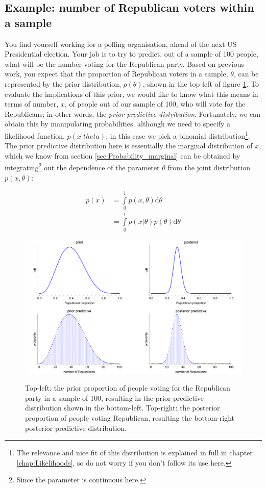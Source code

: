 \documentclass[11pt,fullpage]{book}
\begin{document}
\subsection{Example: number of Republican voters within a sample}
You find yourself working for a polling organisation, ahead of the next US Presidential election. Your job is to try to predict, out of a sample of 100 people, what will be the number voting for the Republican party. Based on previous work, you expect that the proportion of Republican voters in a sample, $\theta$, can be represented by the prior distribution, $p(\theta)$, shown in the top-left of figure \ref{fig:Posterior_priorPosteriorPredictiveVoting}. To evaluate the implications of this prior, we would like to know what this means in terms of number, $x$, of people out of our sample of 100, who will vote for the Republicans; in other words, the \textit{prior predictive distribution}. Fortunately, we can obtain this by manipulating probabilities, although we need to specify a likelihood function, $p(x|theta)$; in this case we pick a binomial distribution\footnote{The relevance and nice fit of this distribution is explained in full in chapter \ref{chap:Likelihoods}, so do not worry if you don't follow its use here.}. The prior predictive distribution here is essentially the marginal distribution of $x$, which we know from section \ref{sec:Probability_marginal} can be obtained by integrating\footnote{Since the parameter is continuous here.} out the dependence of the parameter $\theta$ from the joint distribution $p(x,\theta)$:

\begin{align}\label{eq:Posterior_priorPredictiveVoting}
p(x) &= \int\limits_{0}^{1} p(x,\theta) \mathrm{d}\theta\\
&= \int\limits_{0}^{1} p(x|\theta) p(\theta) \mathrm{d}\theta
\end{align}

\begin{figure}
\centering
\scalebox{0.4} 
{\includegraphics{Posterior_priorPosteriorPredictiveVoting.pdf}}
\caption{Top-left: the prior proportion of people voting for the Republican party in a sample of 100, resulting in the prior predictive distribution shown in the bottom-left. Top-right: the posterior proportion of people voting Republican, resulting the bottom-right posterior predictive distribution.}\label{fig:Posterior_priorPosteriorPredictiveVoting}
\end{figure}
\end{document}
